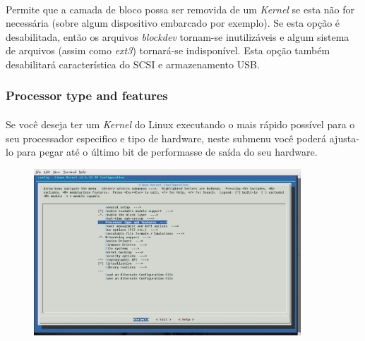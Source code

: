 \documentclass[a4paper,10pt]{article}
\begin{document}
    \paragraph{}
    Permite que a camada de bloco possa ser removida de um \emph{Kernel} se esta não for necessária (sobre algum dispositivo embarcado
    por exemplo). Se esta opção é desabilitada, então os arquivos \emph{blockdev} tornam-se inutilizáveis e algum sistema de arquivos
    (assim como \emph{ext3}) tornará-se indisponível. Esta opção também desabilitará característica do SCSI e armazenamento USB.

  \subsubsection{Processor type and features}
    \paragraph{}
    Se você deseja ter um \emph{Kernel} do Linux executando o mais rápido possível para o seu processador especifico e tipo de hardware, 
    neste submenu você poderá ajusta-lo para pegar até o último bit de performasse de saída do seu hardware. 

    \begin{figure}[ht]
    \center
    \includegraphics[width=10cm]{images/ProcessoTypeAndFeature.png}
    \end{figure}
\end{document}
